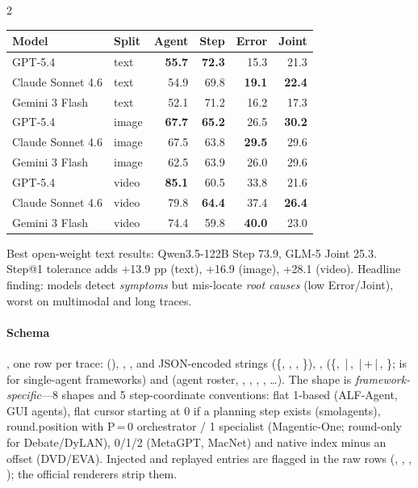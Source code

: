 \begin{multicols}{2}
\begin{center}\footnotesize
\begin{tabular}{@{}llrrrr@{}}\toprule
Model & Split & Agent & Step & Error & Joint\\\midrule
GPT-5.4 & text & \textbf{55.7} & \textbf{72.3} & 15.3 & 21.3\\
Claude Sonnet 4.6 & text & 54.9 & 69.8 & \textbf{19.1} & \textbf{22.4}\\
Gemini 3 Flash & text & 52.1 & 71.2 & 16.2 & 17.3\\\midrule
GPT-5.4 & image & \textbf{67.7} & \textbf{65.2} & 26.5 & \textbf{30.2}\\
Claude Sonnet 4.6 & image & 67.5 & 63.8 & \textbf{29.5} & 29.6\\
Gemini 3 Flash & image & 62.5 & 63.9 & 26.0 & 29.6\\\midrule
GPT-5.4 & video & \textbf{85.1} & 60.5 & 33.8 & 21.6\\
Claude Sonnet 4.6 & video & 79.8 & \textbf{64.4} & 37.4 & \textbf{26.4}\\
Gemini 3 Flash & video & 74.4 & 59.8 & \textbf{40.0} & 23.0\\\bottomrule
\end{tabular}
\end{center}
Best open-weight text results: Qwen3.5-122B Step 73.9, GLM-5 Joint 25.3. Step@1 tolerance adds +13.9 pp (text), +16.9 (image), +28.1 (video). Headline finding: models detect \emph{symptoms} but mis-locate \emph{root causes} (low Error/Joint), worst on multimodal and long traces.

\paragraph{Schema} , one row per trace:  (), , , and JSON-encoded strings  (\{, , , \}), ,  (\{, \,|\,, \,|\,+\,|\,, \};  is  for single-agent frameworks) and  (agent roster, , , , , \ldots). The  shape is \emph{framework-specific}---8 shapes and 5 step-coordinate conventions: flat 1-based  (ALF-Agent, GUI agents), flat cursor starting at 0 if a planning step exists (smolagents),  round.position with P\,=\,0 orchestrator / 1 specialist (Magentic-One; round-only for Debate/DyLAN),  0/1/2 (MetaGPT, MacNet) and native index minus an offset (DVD/EVA). Injected and replayed entries are flagged in the raw rows (, , , ); the official renderers strip them.
\end{multicols}

